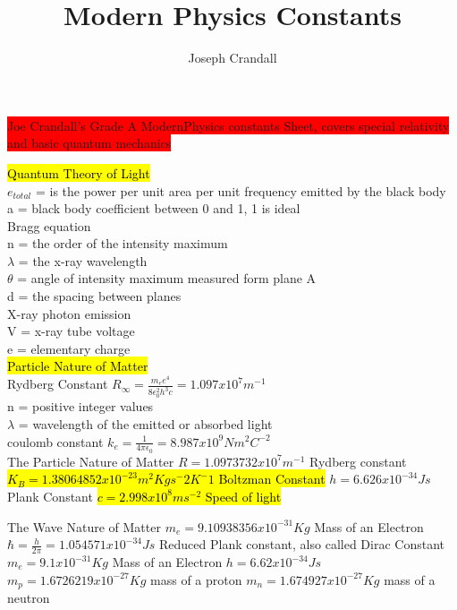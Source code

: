 \documentclass[6pt, oneside]{article}   	%
\title{Modern Physics Constants}
\author{Joseph Crandall}
\begin{document}
\colorbox{red}{Joe Crandall's Grade A ModernPhysics constants Sheet, covers special relativity and basic quantum mechanics}




\hl{Quantum Theory of Light}\\
$e_{total}$ = is the power per unit area per unit frequency emitted by the black body\\
a = black body coefficient between 0 and 1, 1 is ideal\\
Bragg equation\\
n = the order of the intensity maximum\\
$\lambda$ = the x-ray wavelength\\
$\theta$  = angle of intensity maximum measured form plane A\\
d = the spacing between planes\\
X-ray photon emission\\ 
V = x-ray tube voltage\\
e = elementary charge\\
\hl{Particle Nature of Matter}\\
Rydberg Constant $R_{\infty}= \frac{m_e e^4}{8\epsilon_0^2 h^3 c} = 1.097x10^{7} m^{-1}$\\
n =  positive integer values\\
$\lambda$ = wavelength of the emitted or absorbed light\\
coulomb constant  $k_e = \frac{1}{4\pi \epsilon_0} = 8.987x10^9 Nm^2C^{-2}$\\ 

\colorbox{BurntOrange}{The Particle Nature of Matter}
$R = 1.0973732x10^7 m^{-1}$ Rydberg constant
\hl{$K_B = 1.38064852x10^{-23}m^2 Kg s^-2 K^-1$ Boltzman Constant}
$h = 6.626x10^{-34}Js$ Plank Constant 
\hl{$c = 2.998x10^{8} ms^{-2}$ Speed of light}

\colorbox{BurntOrange}{The Wave Nature of Matter}
$m_e = 9.10938356x10^{-31}Kg$ Mass of an Electron
$\hbar = \frac{h}{2\pi} = 1.054571x10^{-34} Js$ Reduced Plank constant, also called Dirac Constant
$m_e = 9.1x10^{-31}Kg$ Mass of an Electron
$h = 6.62x10^{-34}Js$
$m_p = 1.6726219x10^{-27}Kg$ mass of a proton
$m_n = 1.674927x10^{-27}Kg$ mass of a neutron
\end{document}
